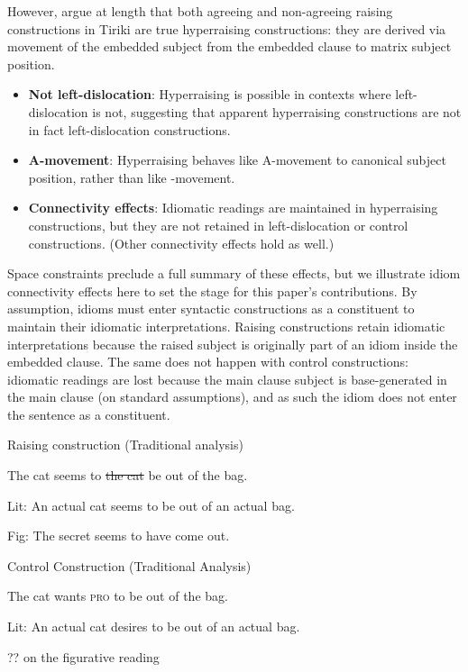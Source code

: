 \documentclass[output=paper,colorlinks,citecolor=brown
]{langscibook}
\begin{document}
However, \citet{diercksetal2022luyia} argue at length that both agreeing and non-agreeing raising constructions in Tiriki are true hyperraising constructions: they are derived via movement of the embedded subject from the embedded clause to matrix subject position. 


\begin{itemize}

\item \textbf{Not left-dislocation}: Hyperraising is possible in contexts where left-dislocation is not, suggesting that apparent hyperraising constructions are not in fact left-dislocation constructions.

\item \textbf{A-movement}: Hyperraising behaves like A-movement to canonical subject position, rather than like \abar-movement.

\item \textbf{Connectivity effects}: Idiomatic readings are maintained in hyperraising constructions, but they are not retained in left-dislocation or control constructions. (Other connectivity effects hold as well.) 

\end{itemize}
\z 

Space constraints preclude a full summary of these effects, but we illustrate idiom connectivity effects here to set the stage for this paper's contributions. By assumption, idioms must enter syntactic constructions as a constituent to maintain their idiomatic interpretations. Raising constructions retain idiomatic interpretations because the raised subject is originally part of an idiom inside the embedded clause. The same does not happen with control constructions: idiomatic readings are lost because the main clause subject is base-generated in the main clause (on standard assumptions), and as such the idiom does not enter the sentence as a constituent.

\ea \label{ex:johnson:EngRaisingControlIdiom}
\begin{xlist}

\ex
{{Raising construction (Traditional analysis)}}

The cat seems to \sout{the cat} be out of the bag.


Lit: An actual cat seems to be out of an actual bag.

Fig: The secret seems to have come out.

\ex
{{Control Construction (Traditional Analysis)}}

The cat wants \textsc{pro} to be out of the bag.


Lit: An actual cat desires to be out of an actual bag.

?? on the figurative reading

\end{xlist}
\z 
\end{document}
